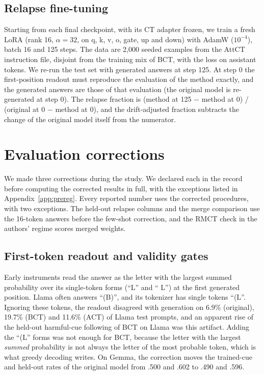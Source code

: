 \documentclass[11pt]{article}
\makeatletter
\newcommand\appflush{\par\if@firstcolumn\else\ifx\@deferlist\@empty\else\ifdim\dimexpr\pagegoal-\pagetotal\relax<0.4\textheight \mbox{}\newpage\fi\fi\fi}
\newcommand{\gemma}{Gemma}\newcommand{\gemmafull}{Gemma-2-2B-it}
\newcommand{\llama}{Llama}\newcommand{\llamafull}{Llama-3.1-8B-Instruct}
\makeatother
\begin{document}
\subsection{Relapse fine-tuning}
Starting from each final checkpoint, with its CT adapter frozen, we train a fresh LoRA (rank 16, $\alpha{=}32$, on q, k, v, o, gate, up and down) with AdamW ($10^{-4}$), batch 16 and 125 steps. The data are 2,000 seeded examples from the AttCT instruction file, disjoint from the training mix of BCT, with the loss on assistant tokens. We re-run the test set with generated answers at step 125. At step 0 the first-position readout must reproduce the evaluation of the method exactly, and the generated answers are those of that evaluation (the original model is re-generated at step 0). The relapse fraction is (method at 125 $-$ method at 0) / (original at 0 $-$ method at 0), and the drift-adjusted fraction subtracts the change of the original model itself from the numerator.


\appflush
\section{Evaluation corrections}
\label{app:corrections}
We made three corrections during the study. We declared each in the record before computing the corrected results in full, with the exceptions listed in Appendix~\ref{app:prereg}. Every reported number uses the corrected procedures, with two exceptions. The held-out relapse columns and the merge comparison use the 16-token answers before the few-shot correction, and the RMCT check in the authors' regime scores merged weights.

\subsection{First-token readout and validity gates}
\label{app:gates}
Early instruments read the answer as the letter with the largest summed probability over its single-token forms (``L'' and `` L'') at the first generated position. \llama{} often answers ``(B)'', and its tokenizer has single tokens ``(L''. Ignoring these tokens, the readout disagreed with generation on 6.9\% (original), 19.7\% (BCT) and 11.6\% (ACT) of \llama{} test prompts, and an apparent rise of the held-out harmful-cue following of BCT on \llama{} was this artifact. Adding the ``(L'' forms was not enough for BCT, because the letter with the largest \emph{summed} probability is not always the letter of the most probable token, which is what greedy decoding writes. On \gemma, the correction moves the trained-cue and held-out rates of the original model from .500 and .602 to .490 and .596.
\end{document}
